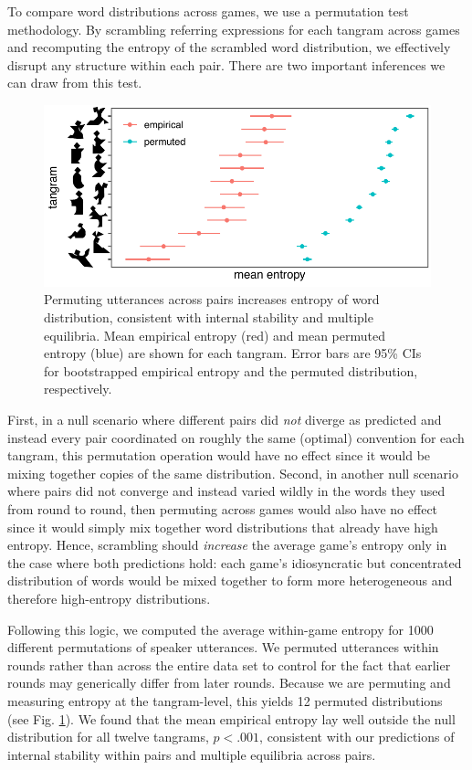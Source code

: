 \documentclass[alpha-refs]{wiley-article}
\begin{document}
To compare word distributions across games, we use a permutation test methodology.
By scrambling referring expressions for each tangram across games and recomputing the entropy of the scrambled word distribution, we effectively disrupt any structure within each pair.
There are two important inferences we can draw from this test.
\begin{figure}[t!]
\centering
\includegraphics[scale=.9]{permutedDiscrete.pdf}
\caption{Permuting utterances across pairs increases entropy of word distribution, consistent with internal stability and multiple equilibria. Mean empirical entropy (red) and mean permuted entropy (blue) are shown for each tangram. Error bars are 95\% CIs for bootstrapped empirical entropy and the permuted distribution, respectively.}
\label{fig:permuted}
\end{figure}
First, in a null scenario where different pairs did \emph{not} diverge as predicted and instead every pair coordinated on roughly the same (optimal) convention for each tangram, this permutation operation would have no effect since it would be mixing together copies of the same distribution.
Second, in another null scenario where pairs did not converge and instead varied wildly in the words they used from round to round, then permuting across games would also have no effect since it would simply mix together word distributions that already have high entropy.
Hence, scrambling should \emph{increase} the average game's entropy only in the case where both predictions hold: each game's idiosyncratic but concentrated distribution of words would be mixed together to form more heterogeneous and therefore high-entropy distributions.

Following this logic, we computed the average within-game entropy for 1000 different permutations of speaker utterances. 
We permuted utterances within rounds rather than across the entire data set to control for the fact that earlier rounds may generically differ from later rounds. 
Because we are permuting and measuring entropy at the tangram-level, this yields 12 permuted distributions (see Fig. \ref{fig:permuted}).
We found that the mean empirical entropy lay well outside the null distribution for all twelve tangrams, $p < .001$, consistent with our predictions of internal stability within pairs and multiple equilibria across pairs.
\end{document}
